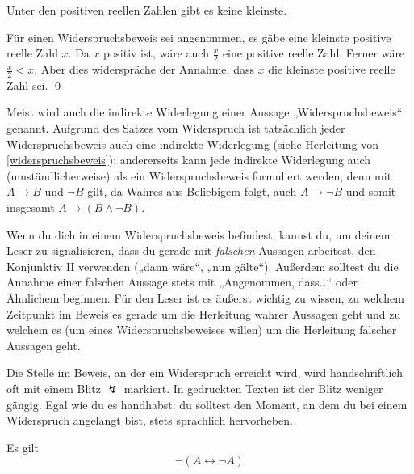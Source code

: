   
\begin{bsp} \label{bsp:widerspruchsbeweis}
    Unter den positiven reellen Zahlen gibt es keine kleinste.
\end{bsp}


\begin{bew}
    Für einen Widerspruchsbeweis sei angenommen, es gäbe eine kleinste positive reelle Zahl $x$. Da $x$ positiv ist, wäre auch $\frac{x}{2}$ eine positive reelle Zahl. Ferner wäre $\frac{x}{2}<x$. Aber dies widerspräche der Annahme, dass $x$ die kleinste positive reelle Zahl sei. \qed
\end{bew}
  
  
\begin{bem}
    Meist wird auch die indirekte Widerlegung einer Aussage „Widerspruchsbeweis“ genannt. Aufgrund des Satzes vom Widerspruch ist tatsächlich jeder Widerspruchsbeweis auch eine indirekte Widerlegung (siehe Herleitung von \cref{widerspruchsbeweis}); andererseits kann jede indirekte Widerlegung auch (umständlicherweise) als ein Widerspruchsbeweis formuliert werden, denn mit $A\to B$ und $\neg B$ gilt, da Wahres aus Beliebigem folgt, auch $A\to \neg B$ und somit insgesamt $A\to (B\land \neg B)$.
\end{bem}

  
\begin{bem}
    Wenn du dich in einem Widerspruchsbeweis befindest, kannst du, um deinem Leser zu signalisieren, dass du gerade mit \emph{falschen} Aussagen arbeitest, den Konjunktiv II verwenden („dann wäre“, „nun gälte“). Außerdem solltest du die Annahme einer falschen Aussage stets mit „Angenommen, dass\dots“ oder Ähnlichem beginnen. Für den Leser ist es äußerst wichtig zu wissen, zu welchem Zeitpunkt im Beweis es gerade um die Herleitung wahrer Aussagen geht und zu welchem es (um eines Widerspruchsbeweises willen) um die Herleitung falscher Aussagen geht.
    
    Die Stelle im Beweis, an der ein Widerspruch erreicht wird, wird handschriftlich oft mit einem Blitz $\lightning$ markiert. In gedruckten Texten ist der Blitz weniger gängig. Egal wie du es handhabst: du solltest den Moment, an dem du bei einem Widerspruch angelangt bist, stets sprachlich hervorheben.
\end{bem}


\begin{satz}[*] \label{paradox}
    Es gilt
        \[ \neg (A\leftrightarrow \neg A) \]
\end{satz}


